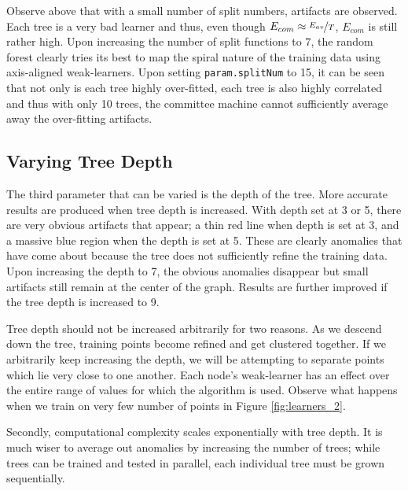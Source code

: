 \documentclass[a4paper,pra,twocolumn,10pt,aps,longbibliography,nobalancelastpage]{article}
\begin{document}
Observe above that with a small number of split numbers, artifacts are observed. Each tree is a very bad learner and thus, even though $E_{com}\approx\nicefrac{E_{av}}{T}$, $E_{com}$ is still rather high. Upon increasing the number of split functions to $7$, the random forest clearly tries its best to map the spiral nature of the training data using axis-aligned weak-learners. Upon setting \texttt{param.splitNum} to 15, it can be seen that not only is each tree highly over-fitted, each tree is also highly correlated and thus with only 10 trees, the committee machine cannot sufficiently average away the over-fitting artifacts.

\subsection{Varying Tree Depth}

The third parameter that can be varied is the depth of the tree. More accurate results are produced when tree depth is increased. With depth set at 3 or 5, there are very obvious artifacts that appear; a thin red line when depth is set at 3, and a massive blue region when the depth is set at 5. These are clearly anomalies that have come about because the tree does not sufficiently refine the training data. Upon increasing the depth to 7, the obvious anomalies disappear but small artifacts still remain at the center of the graph. Results are further improved if the tree depth is increased to 9. 

Tree depth should not be increased arbitrarily for two reasons. As we descend down the tree, training points become refined and get clustered together. If we arbitrarily keep increasing the depth, we will be attempting to separate points which lie very close to one another. Each node's weak-learner has an effect over the entire range of values for which the algorithm is used. Observe what happens when we train on very few number of points in Figure \ref{fig:learners_2}.

Secondly, computational complexity scales exponentially with tree depth. It is much wiser to average out anomalies by increasing the number of trees; while trees can be trained and tested in parallel, each individual tree must be grown sequentially.
\end{document}
